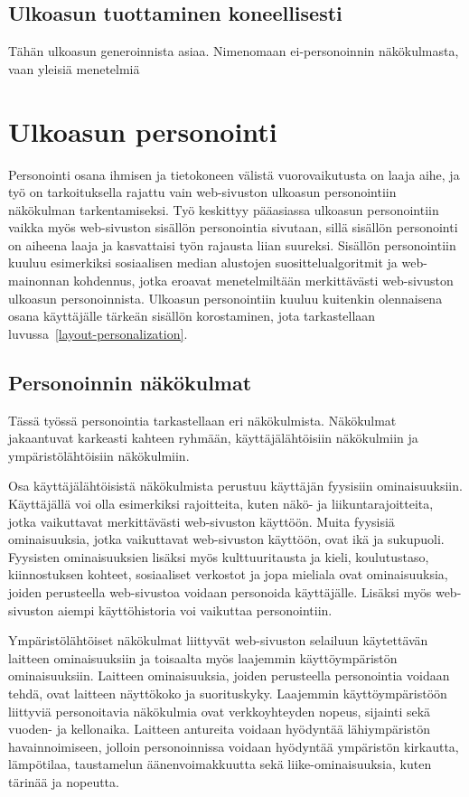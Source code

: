 \documentclass[finnish, 12pt, a4paper, elec, utf8, a-1b, online]{aaltothesis}
\begin{document}
\subsection{Ulkoasun tuottaminen koneellisesti}

Tähän ulkoasun generoinnista asiaa. Nimenomaan ei-personoinnin näkökulmasta,
vaan yleisiä menetelmiä

\clearpage

\section{Ulkoasun personointi}

Personointi osana ihmisen ja tietokoneen välistä vuorovaikutusta on laaja aihe,
ja työ on tarkoituksella rajattu vain web-sivuston ulkoasun personointiin
näkökulman tarkentamiseksi. Työ keskittyy pääasiassa ulkoasun personointiin
vaikka myös web-sivuston sisällön personointia sivutaan, sillä sisällön
personointi on aiheena laaja ja kasvattaisi työn rajausta liian suureksi.
Sisällön personointiin kuuluu esimerkiksi sosiaalisen median alustojen
suosittelualgoritmit ja web-mainonnan kohdennus, jotka eroavat menetelmiltään
merkittävästi web-sivuston ulkoasun personoinnista. Ulkoasun personointiin
kuuluu kuitenkin olennaisena osana käyttäjälle tärkeän sisällön korostaminen,
jota tarkastellaan luvussa~\ref{layout-personalization}.

\subsection{Personoinnin näkökulmat}\label{personalization-aspects}

Tässä työssä personointia tarkastellaan eri näkökulmista. Näkökulmat jakaantuvat
karkeasti kahteen ryhmään, käyttäjälähtöisiin näkökulmiin ja ympäristölähtöisiin
näkökulmiin.

Osa käyttäjälähtöisistä näkökulmista perustuu käyttäjän fyysisiin
ominaisuuksiin. Käyttäjällä voi olla esimerkiksi rajoitteita, kuten näkö- ja
liikuntarajoitteita, jotka vaikuttavat merkittävästi web-sivuston käyttöön.
Muita fyysisiä ominaisuuksia, jotka vaikuttavat web-sivuston käyttöön, ovat ikä
ja sukupuoli. Fyysisten ominaisuuksien lisäksi myös kulttuuritausta ja kieli,
koulutustaso, kiinnostuksen kohteet, sosiaaliset verkostot ja jopa mieliala ovat
ominaisuuksia, joiden perusteella web-sivustoa voidaan personoida käyttäjälle.
Lisäksi myös web-sivuston aiempi käyttöhistoria voi vaikuttaa personointiin.

Ympäristölähtöiset näkökulmat liittyvät web-sivuston selailuun käytettävän
laitteen ominaisuuksiin ja toisaalta myös laajemmin käyttöympäristön
ominaisuuksiin. Laitteen ominaisuuksia, joiden perusteella personointia voidaan
tehdä, ovat laitteen näyttökoko ja suorituskyky. Laajemmin käyttöympäristöön
liittyviä personoitavia näkökulmia ovat verkkoyhteyden nopeus, sijainti sekä
vuoden- ja kellonaika. Laitteen antureita voidaan hyödyntää lähiympäristön
havainnoimiseen, jolloin personoinnissa voidaan hyödyntää ympäristön kirkautta,
lämpötilaa, taustamelun äänenvoimakkuutta sekä liike-ominaisuuksia, kuten
tärinää ja nopeutta.
\end{document}
